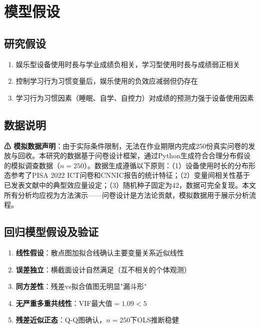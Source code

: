\documentclass[11pt]{ctexart}
\begin{document}
\section{模型假设}

\subsection{研究假设}
\begin{enumerate}[label=H\arabic*:,leftmargin=*]
    \item 娱乐型设备使用时長与学业成绩负相关，学习型使用时長与成绩弱正相关
    \item 控制学习行为习惯变量后，娱乐使用的负效应减弱但仍存在
    \item 学习行为习惯因素（睡眠、自学、自控力）对成绩的预测力强于设备使用因素
\end{enumerate}

\subsection{数据说明}

\textbf{⚠ 模拟数据声明}：由于实际条件限制，无法在作业期限内完成250份真实问卷的发放与回收。本研究的数据基于问卷设计框架，通过Python生成符合合理分布假设的模拟调查数据（$n=250$）。数据生成遵循以下原则：（1）设备使用时长的分布形态参考了PISA 2022 ICT问卷和CNNIC报告的统计特征；（2）变量间相关性基于已发表文献中的典型效应量设定；（3）随机种子固定为42，数据可完全复现。本文所有分析均应视为方法演示——问卷设计是方法论贡献，模拟数据用于展示分析流程。

\subsection{回归模型假设及验证}
\begin{enumerate}[leftmargin=*]
    \item \textbf{线性假设}：散点图加拟合线确认主要变量关系近似线性
    \item \textbf{误差独立}：横截面设计自然满足（互不相关的个体观测）
    \item \textbf{同方差性}：残差vs拟合值图无明显"漏斗形"
    \item \textbf{无严重多重共线性}：VIF最大值$=1.09<5$
    \item \textbf{残差近似正态}：Q-Q图确认，$n=250$下OLS推断稳健
\end{enumerate}

\end{document}
